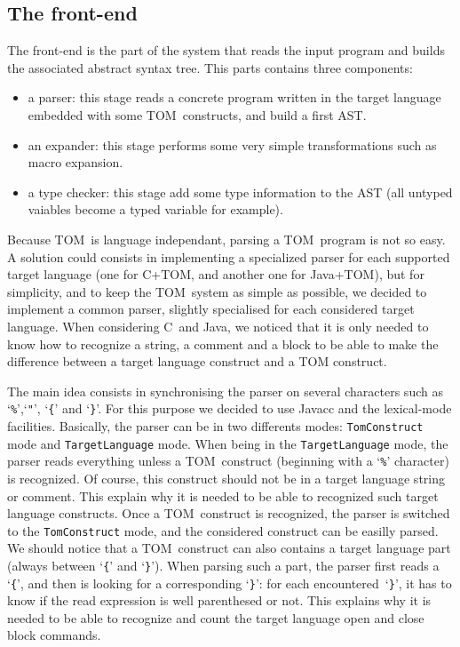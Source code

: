 \documentclass[a4paper]{article}
\newcommand{\TOM}{\textsf{TOM}}
\newcommand{\C}{\textsf{C}}
\newcommand{\Java}{\textsf{Java}}
\begin{document}
\subsection{The front-end}
The front-end is the part of the system that reads the input program
and builds the associated abstract syntax tree.
This parts contains three components:
\begin{itemize}
\item a parser: this stage reads a concrete program written in the
  target language embedded with some \TOM\ constructs, and build a
  first AST.
\item an expander: this stage performs some very simple
  transformations such as macro expansion.
\item a type checker: this stage add some type information to the AST
  (all untyped vaiables become a typed variable for example).
\end{itemize}

Because \TOM\ is language independant, parsing a \TOM\ program is not
so easy. A solution could consists in implementing a specialized
parser for each supported target language (one for \C+\TOM, and
another one for \Java+\TOM), but for simplicity, and to keep the \TOM\
system as simple as possible, we decided to implement a common parser,
slightly specialised for each considered target language. 
When considering \C\ and \Java, we noticed that it is only needed to
know how to recognize a string, a comment and a block to be able to
make the difference between a target language construct and a \TOM
construct.

The main idea consists in synchronising the parser on several
characters such as `\texttt{\%}',`\texttt{"}', `\texttt{\{}' and
`\texttt{\}}'. For this purpose we decided to use \textsf{Javacc} and
the lexical-mode facilities. Basically, the parser can be in two
differents modes: \texttt{TomConstruct} mode and
\texttt{TargetLanguage} mode.
When being in the \texttt{TargetLanguage} mode, the parser reads
everything unless a \TOM\ construct (beginning with a `\texttt{\%}'
character) is recognized. Of course, this construct should not be in a
target language string or comment. This explain why it is needed to be
able to recognized such target language constructs.
Once a \TOM\ construct is recognized, the parser is switched to the
\texttt{TomConstruct} mode, and the considered construct can be
easilly parsed. 
We should notice that a \TOM\ construct can also contains a target
language part (always between `\texttt{\{}' and `\texttt{\}}').
When parsing such a part, the parser first reads a `\texttt{\{}', and
then is looking for a corresponding `\texttt{\}}': for each
encountered~`\texttt{\}}', it has to know if the read expression is
well parenthesed or not. This explains why it is needed to be able to
recognize and count the target language open and close block
commands. 
\end{document}
